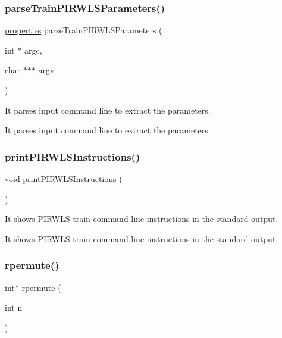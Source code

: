 \subsubsection{\texorpdfstring{parse\+Train\+P\+I\+R\+W\+L\+S\+Parameters()}{parseTrainPIRWLSParameters()}}
{\ttfamily \hyperlink{structproperties}{properties} parse\+Train\+P\+I\+R\+W\+L\+S\+Parameters (\begin{DoxyParamCaption}\item[{int $\ast$}]{argc,  }\item[{char $\ast$$\ast$$\ast$}]{argv }\end{DoxyParamCaption})}



It parses input command line to extract the parameters. 

It parses input command line to extract the parameters. \hypertarget{PIRWLS-train_8h_ac4a62e1a98c35f9d7e8996d58fe48523}{}\label{PIRWLS-train_8h_ac4a62e1a98c35f9d7e8996d58fe48523} 
\subsubsection{\texorpdfstring{print\+P\+I\+R\+W\+L\+S\+Instructions()}{printPIRWLSInstructions()}}
{\ttfamily void print\+P\+I\+R\+W\+L\+S\+Instructions (\begin{DoxyParamCaption}{ }\end{DoxyParamCaption})}



It shows P\+I\+R\+W\+L\+S-\/train command line instructions in the standard output. 

It shows P\+I\+R\+W\+L\+S-\/train command line instructions in the standard output. \hypertarget{PIRWLS-train_8h_a9e75aabe599f48c66cbda89320d68a71}{}\label{PIRWLS-train_8h_a9e75aabe599f48c66cbda89320d68a71} 
\subsubsection{\texorpdfstring{rpermute()}{rpermute()}}
{\ttfamily int$\ast$ rpermute (\begin{DoxyParamCaption}\item[{int}]{n }\end{DoxyParamCaption})}



